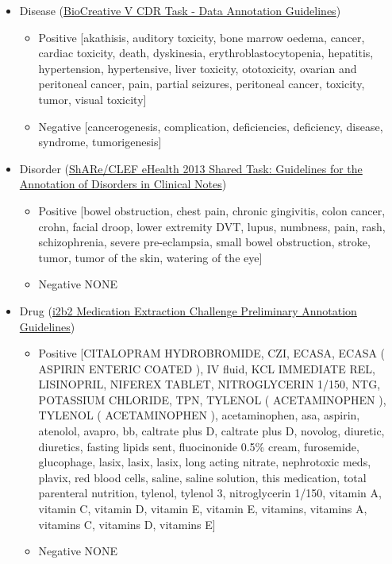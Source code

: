 \documentclass{article}
\begin{document}
\begin{itemize}
\item Disease
(\href{https://biocreative.bioinformatics.udel.edu/media/store/files/2015/bc5_CDR_data_guidelines.pdf}{BioCreative V CDR Task - Data Annotation Guidelines})
\begin{itemize}
\item {Positive}
[akathisis, auditory toxicity, bone marrow oedema, cancer, cardiac toxicity, death, dyskinesia, erythroblastocytopenia, hepatitis, hypertension, hypertensive, liver toxicity, ototoxicity, ovarian and peritoneal cancer, pain, partial seizures, peritoneal cancer, toxicity, tumor, visual toxicity]
\item {Negative}
[cancerogenesis, complication, deficiencies, deficiency, disease, syndrome, tumorigenesis]
\end{itemize}
\end{itemize}


\begin{itemize}
\item Disorder (\href{https://drive.google.com/file/d/0B7oJZ-fwZvH5VmhyY3lHRFJhWkk/edit}{ShARe/CLEF eHealth 2013 Shared Task: Guidelines for the Annotation of Disorders in Clinical Notes})
\begin{itemize}
\item {Positive}
[bowel obstruction, chest pain, chronic gingivitis, colon cancer, crohn, facial droop, lower extremity DVT, lupus, numbness, pain, rash, schizophrenia, severe pre-eclampsia, small bowel obstruction, stroke, tumor, tumor of the skin, watering of the eye]
\item {Negative} {NONE}
\end{itemize}
\end{itemize}


\begin{itemize}
\item Drug (\href{http://faculty.washington.edu/fxia/mpapers/2009/uzuner2009_i2b2_annot.pdf}{i2b2 Medication Extraction Challenge Preliminary Annotation Guidelines})
\begin{itemize}
\item {Positive}
[CITALOPRAM HYDROBROMIDE, CZI, ECASA, ECASA ( ASPIRIN ENTERIC COATED ), IV fluid, KCL IMMEDIATE REL, LISINOPRIL, NIFEREX TABLET, NITROGLYCERIN 1/150, NTG, POTASSIUM CHLORIDE, TPN, TYLENOL ( ACETAMINOPHEN ), TYLENOL ( ACETAMINOPHEN ), acetaminophen, asa, aspirin, atenolol, avapro, bb, caltrate plus D, caltrate plus D, novolog, diuretic, diuretics, fasting lipids sent, fluocinonide 0.5\% cream, furosemide, glucophage, lasix, lasix, lasix, long acting nitrate, nephrotoxic meds, plavix, red blood cells, saline, saline solution, this medication, total parenteral nutrition, tylenol, tylenol 3, nitroglycerin 1/150, vitamin A, vitamin C, vitamin D, vitamin E, vitamin E, vitamins, vitamins A, vitamins C, vitamins D, vitamins E]
\item {Negative} {NONE}
\end{itemize}
\end{itemize}
\end{document}
